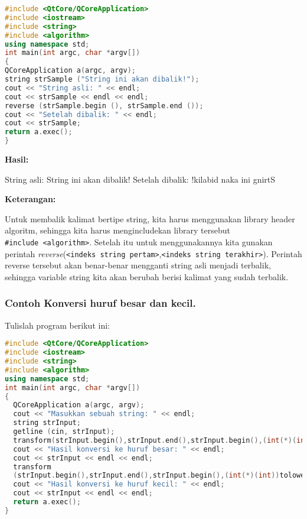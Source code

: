 \begin{lstlisting}[language=c++, caption=Membalik kata / kalimat, label=contoh3-29]
#include <QtCore/QCoreApplication>
#include <iostream>
#include <string>
#include <algorithm>
using namespace std;
int main(int argc, char *argv[])
{
QCoreApplication a(argc, argv);
string strSample ("String ini akan dibalik!");
cout << "String asli: " << endl;
cout << strSample << endl << endl;
reverse (strSample.begin (), strSample.end ());
cout << "Setelah dibalik: " << endl;
cout << strSample;
return a.exec();
}
\end{lstlisting}

\textbf{Hasil:}

\begin{lcverbatim}
String asli:
String ini akan dibalik!
Setelah dibalik:
!kilabid naka ini gnirtS
\end{lcverbatim}

\textbf{Keterangan:}

Untuk membalik kalimat bertipe string, kita harus menggunakan library
header algoritm, sehingga kita harus mengincludekan library tersebut
\texttt{\#include\ \textless{}algorithm\textgreater{}}. Setelah itu
untuk menggunakannya kita gunakan perintah
\emph{reverse}(\texttt{\textless{}indeks\ string\ pertam\textgreater{}},\texttt{\textless{}indeks\ string\ terakhir\textgreater{}}).
Perintah reverse tersebut akan benar-benar mengganti string asli menjadi
terbalik, sehingga variable string kita akan berubah berisi kalimat yang
sudah terbalik.

\subsubsection*{Contoh  Konversi huruf besar dan kecil.}

Tulislah program berikut ini:

\begin{lstlisting}[language=c++, caption=Konversi huruf besar dan kecil, label=contoh3-30]
#include <QtCore/QCoreApplication>
#include <iostream>
#include <string>
#include <algorithm>
using namespace std;
int main(int argc, char *argv[])
{
  QCoreApplication a(argc, argv);
  cout << "Masukkan sebuah string: " << endl;
  string strInput;
  getline (cin, strInput);
  transform(strInput.begin(),strInput.end(),strInput.begin(),(int(*)(int))toupper);
  cout << "Hasil konversi ke huruf besar: " << endl;
  cout << strInput << endl << endl;
  transform
  (strInput.begin(),strInput.end(),strInput.begin(),(int(*)(int))tolower);
  cout << "Hasil konversi ke huruf kecil: " << endl;
  cout << strInput << endl << endl;
  return a.exec();
}
\end{lstlisting}

